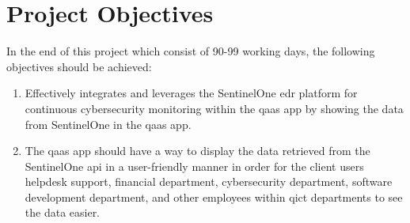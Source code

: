 \section{Project Objectives}
In the end of this project which consist of 90-99 working days, the following objectives should be achieved:
\begin{enumerate}
      \item Effectively integrates and leverages the SentinelOne \acrshort{edr} platform for continuous
            cybersecurity monitoring within the \acrshort{qaas} app by showing the data from SentinelOne
            in the \acrshort{qaas} app.
      \item The \acrshort{qaas} app should have a way to display the data retrieved from the SentinelOne
            \acrshort{api} in a user-friendly manner in order for the client users helpdesk support, financial
            department, cybersecurity department, software development department, and other employees within
            \acrshort{qict}  departments to see the data easier.
\end{enumerate}
